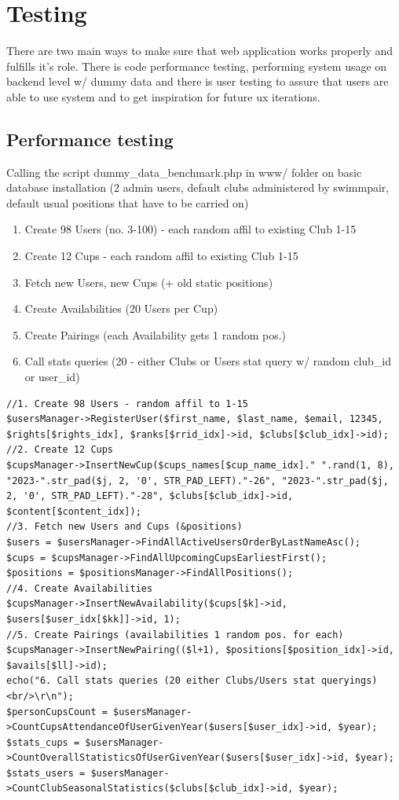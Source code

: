 \chapter{Testing}
There are two main ways to make sure that web application works properly and fulfills it's role. There is code performance testing, performing system usage on backend level w/ dummy data and there is user testing to assure that users are able to use system and to get inspiration for future ux iterations.
\section{Performance testing}
Calling the script dummy\_data\_benchmark.php in www/ folder on basic database installation (2 admin users, default clubs administered by swimmpair, default usual positions that have to be carried on)
\begin{enumerate}
    \item Create 98 Users (no. 3-100) - each random affil to existing  Club 1-15
    \item Create 12 Cups - each random affil to existing Club 1-15
    \item Fetch new Users, new Cups (+ old static positions)
    \item Create Availabilities (20 Users per Cup)
    \item Create Pairings (each Availability gets 1 random pos.)
    \item Call stats queries (20 - either Clubs or Users stat query w/ random club\_id or user\_id)
\end{enumerate}    
\begin{lstlisting}
//1. Create 98 Users - random affil to 1-15
$usersManager->RegisterUser($first_name, $last_name, $email, 12345, $rights[$rights_idx], $ranks[$rrid_idx]->id, $clubs[$club_idx]->id);
//2. Create 12 Cups
$cupsManager->InsertNewCup($cups_names[$cup_name_idx]." ".rand(1, 8), "2023-".str_pad($j, 2, '0', STR_PAD_LEFT)."-26", "2023-".str_pad($j, 2, '0', STR_PAD_LEFT)."-28", $clubs[$club_idx]->id, $content[$content_idx]);
//3. Fetch new Users and Cups (&positions)
$users = $usersManager->FindAllActiveUsersOrderByLastNameAsc();
$cups = $cupsManager->FindAllUpcomingCupsEarliestFirst();
$positions = $positionsManager->FindAllPositions();
//4. Create Availabilities
$cupsManager->InsertNewAvailability($cups[$k]->id, $users[$user_idx[$kk]]->id, 1);
//5. Create Pairings (availabilities 1 random pos. for each)
$cupsManager->InsertNewPairing(($l+1), $positions[$position_idx]->id, $avails[$ll]->id);
echo("6. Call stats queries (20 either Clubs/Users stat queryings)<br/>\r\n");
$personCupsCount = $usersManager->CountCupsAttendanceOfUserGivenYear($users[$user_idx]->id, $year);
$stats_cups = $usersManager->CountOverallStatisticsOfUserGivenYear($users[$user_idx]->id, $year);
$stats_users = $usersManager->CountClubSeasonalStatistics($clubs[$club_idx]->id, $year);

\end{lstlisting}
